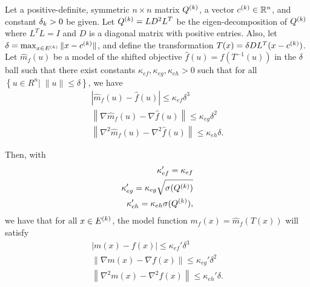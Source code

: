 \begin{theorem}
\label{shifted_ellipsoid}
Let a positive-definite, symmetric $n\times n$ matrix ${Q^{(k)}}$, a vector ${c^{(k)}} \in \mathbb R^n$, and constant ${\delta_k} > 0$ be given.
Let ${Q^{(k)}} = L D^2 L^T$ be the eigen-decomposition of ${Q^{(k)}}$ where $L^TL = I$ and $D$ is a diagonal matrix with positive entries.
Also, let $\delta = \max_{x\in {E^{(k)}}}\|x-{c^{(k)}}\|$, 
and define the transformation $T(x) = \delta DL^T(x - {c^{(k)}})$.
Let $\hat m_f(u)$ be a model of the shifted objective $\hat f(u) = f(T^{-1}(u))$ in the $\delta$ ball such that
there exist constants $\kappa_{ef}, \kappa_{eg}, \kappa_{eh} > 0$ such that for all $\left\{u \in R^n | \;\|u\| \le \delta \right\}$, we have
\begin{align*}
\left|\hat m_f(u) - \hat f(u)\right| \le \kappa_{ef} \delta^3\\
\left\|\nabla \hat m_f(u) - \nabla \hat f(u)\right\| \le \kappa_{eg}\delta^2\\
\left\|\nabla^2 \hat m_f(u) - \nabla^2 \hat f(u)\right\| \le \kappa_{eh}\delta.
\end{align*}

Then, with
\begin{align*}
\kappa_{ef}' = \kappa_{ef} \\
\kappa_{eg}' = \kappa_{eg}\sqrt{{\sigma}({Q^{(k)}})} \\
\kappa_{eh}' = \kappa_{eh}{\sigma}({Q^{(k)}}),
\end{align*}
we have that for all $x \in {E^{(k)}}$,
the model function $m_f(x) = \hat m_f(T(x))$ will satisfy
\begin{align*}
\left| m(x) - f(x)\right| \le \kappa_{ef}'\delta^3 \\
\left\|\nabla  m(x) - \nabla  f(x)\right\| \le \kappa_{eg}'\delta^2 \\
\left\|\nabla^2 m(x) - \nabla^2 f(x)\right\| \le \kappa_{eh}'\delta.
\end{align*}
\end{theorem}


